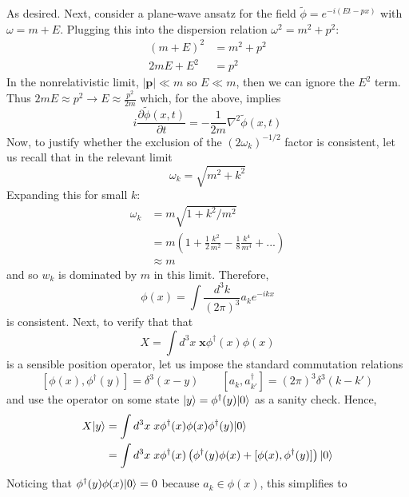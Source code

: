 \documentclass[12pt]{article}
\DeclarePairedDelimiter\ket{\lvert}{\rangle}
\begin{document}
As desired. Next, consider a plane-wave ansatz for the field $\tilde{\phi} = e^{-i(Et - px)}$ with $\omega = m + E$. Plugging this into the dispersion relation $\omega^2 = m^2 + p^2$:
\begin{align*}
    (m + E)^2 &= m^2 + p^2 \\
    2mE + E^2 &= p^2
\end{align*}
In the nonrelativistic limit, $|\mathbf{p}| \ll m$ so $E \ll m$, then we can ignore the $E^2$ term. Thus $2mE \approx p^2 \rightarrow E \approx \frac{p^2}{2m}$ which, for the above, implies
\begin{equation}
    \boxed{i\frac{\partial\tilde{\phi}(x,t)}{\partial t} = -\frac{1}{2m}\nabla^2\tilde{\phi}(x,t)}
\end{equation}
Now, to justify whether the exclusion of the $(2\omega_k)^{-1/2}$ factor is consistent, let us recall that in the relevant limit
$$ \omega_k = \sqrt{m^2 +k^2}$$
Expanding this for small $k$:
\begin{align*}
    \omega_k &= m\sqrt{1 + k^2/m^2} \\
    &= m\left(1 + \frac{1}{2}\frac{k^2}{m^2} - \frac{1}{8}\frac{k^4}{m^4} + ...\right) \\
    &\approx m
\end{align*}
and so $w_k$ is dominated by $m$ in this limit. Therefore,
\begin{equation}
    \boxed{\phi(x) = \int \frac{d^3k}{(2\pi)^3}a_ke^{-ikx}}
\end{equation}
is consistent. Next, to verify that that
\begin{equation*}
    X = \int d^3x \;\textbf{x} \phi^{\dagger}(x)\phi(x)
\end{equation*}
is a sensible position operator, let us impose the standard commutation relations
\begin{equation*}
    \left[\phi(x), \phi^{\dagger}(y)\right] = \delta^3(x-y) \qquad \left[a_k, a_{k'}^{\dagger} \right] =(2\pi)^3\delta^3(k - k')
\end{equation*}
and use the operator on some state $\ket{y} = \phi^{\dagger}(y)\ket{0}$ as a sanity check. Hence,
\begin{align*}
    X\ket{y} &= \int d^3x \; x\phi^{\dagger}(x)\phi(x)\phi^{\dagger}(y)\ket{0} \\
    &= \int d^3x \; x \phi^{\dagger}(x)\left(\phi^{\dagger}(y)\phi(x) + [\phi(x), \phi^{\dagger}(y)]\right) \ket{0} \\
\end{align*}
Noticing that $\phi^{\dagger}(y)\phi(x)\ket{0} = 0$ because $a_k \in \phi(x)$, this simplifies to
\end{document}
